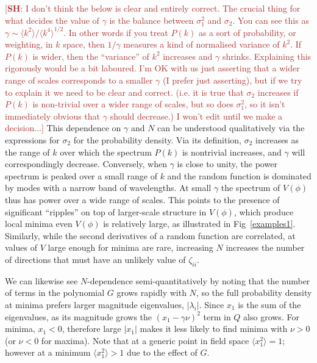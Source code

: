 \documentclass[12pt]{article}
\newcommand{\SH}[1]{\textcolor{brown}{[{\bf SH}: #1]}}
\begin{document}
  \SH{I don't think the below is clear and entirely correct. The crucial thing for what decides the value of $\gamma$ is the balance between $\sigma_1^2$ and $\sigma_2$. You can see this as $\gamma \sim \langle k^2\rangle/\langle k^4\rangle^{1/2}$. In other words if you treat $P(k)$ as a sort of probability, or weighting, in $k$ space, then $1/\gamma$ measures a kind of normalised variance of $k^2$. If $P(k)$ is wider, then the ``variance'' of $k^2$ increases and $\gamma$ shrinks. Explaining this rigorously would be a bit laboured. I'm OK with us just asserting that a wider range of scales corresponds to a smaller $\gamma$ (I prefer just asserting), but if we try to explain it we need to be clear and correct. (i.e. it is true that $\sigma_2$ increases if $P(k)$ is non-trivial over a wider range of scales, but so does $\sigma_1^2$, so it isn't immediately obvious that $\gamma$ should decrease.) I won't edit until we make a decision...}
This dependence on $\gamma$ and $N$ can be understood qualitatively via the expressions for $\sigma_2$ for the probability density. Via its definition, $\sigma_2$ increases as the range of $k$ over which the spectrum $P(k)$  is nontrivial  increases, and $\gamma$ will correspondingly decrease. Conversely, when $\gamma$ is close to unity, the power spectrum is peaked over a small range of $k$ and the random function is dominated by modes with a narrow band of wavelengths.  At small $\gamma$ the spectrum of $V(\phi)$ thus has power over a wide range of scales. This points to the presence of significant ``ripples'' on top of  larger-scale structure in $V(\phi)$, which  produce local minima even $V(\phi)$ is relatively large,  as illustrated in Fig~\ref{examples1}.  Similarly, while the second derivatives of a random function are correlated, at values of $V$ large enough for minima are rare, increasing $N$  increases the number of directions that must have an unlikely value of $\zeta_{ii}$. 

We can likewise see $N$-dependence semi-quantitatively by noting that the number of terms in the polynomial $G$ grows rapidly with $N$, so the full probability density at minima prefers larger magnitude eigenvalues, $|\lambda_i|$. Since $x_1$ is the sum of the eigenvalues, as its magnitude grows the $(x_1-\gamma \nu)^2$ term in $Q$ also grows. For minima, $x_1<0$, therefore large $|x_1|$ makes it less likely to find minima with $\nu >0$ (or $\nu <0 $ for maxima).  Note that at a generic point in field space $\langle x_1^2\rangle = 1$; however at a minimum $\langle x_1^2 \rangle >1$ due to the effect of $G$.   
\end{document}
